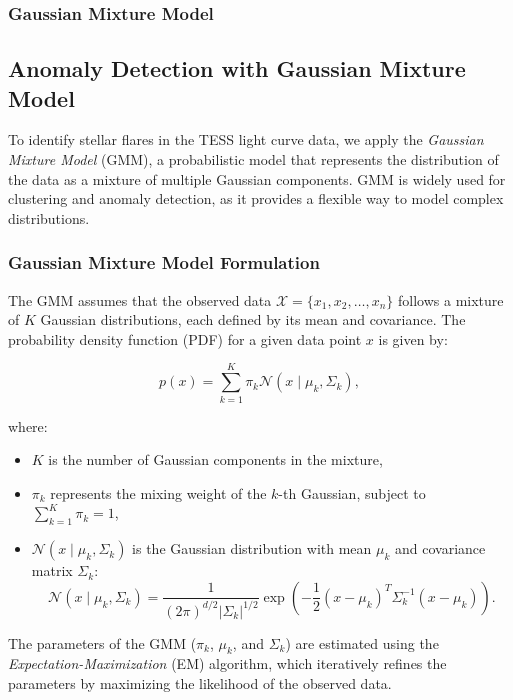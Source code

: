 \documentclass[
]{article}
\begin{document}
\subsubsection{Gaussian Mixture Model}\label{gaussian-mixture-model}

\subsection{Anomaly Detection with Gaussian Mixture Model}

To identify stellar flares in the TESS light curve data, we apply the \textit{Gaussian Mixture Model} (GMM), a probabilistic model that represents the distribution of the data as a mixture of multiple Gaussian components. GMM is widely used for clustering and anomaly detection, as it provides a flexible way to model complex distributions.

\subsubsection{Gaussian Mixture Model Formulation}

The GMM assumes that the observed data \(\mathcal{X} = \{x_1, x_2, \dots, x_n\}\) follows a mixture of \(K\) Gaussian distributions, each defined by its mean and covariance. The probability density function (PDF) for a given data point \(x\) is given by:

\begin{equation}
    p(x) = \sum_{k=1}^{K} \pi_k \mathcal{N}(x \mid \mu_k, \Sigma_k),
\end{equation}

where:

\begin{itemize}
    \item $K$ is the number of Gaussian components in the mixture,
    \item $\pi_k$ represents the mixing weight of the $k$-th Gaussian, subject to $\sum_{k=1}^{K} \pi_k = 1$,
    \item $\mathcal{N}(x \mid \mu_k, \Sigma_k)$ is the Gaussian distribution with mean $\mu_k$ and covariance matrix $\Sigma_k$:
    \begin{equation}
        \mathcal{N}(x \mid \mu_k, \Sigma_k) = \frac{1}{(2\pi)^{d/2} |\Sigma_k|^{1/2}} \exp \left( -\frac{1}{2} (x - \mu_k)^T \Sigma_k^{-1} (x - \mu_k) \right).
    \end{equation}
\end{itemize}

The parameters of the GMM (\(\pi_k\), \(\mu_k\), and \(\Sigma_k\)) are estimated using the \textit{Expectation-Maximization} (EM) algorithm, which iteratively refines the parameters by maximizing the likelihood of the observed data.
\end{document}
